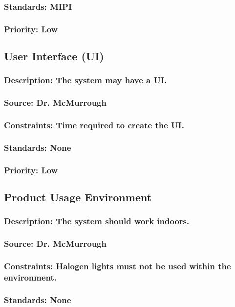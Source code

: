 \subsubsection{Standards: MIPI}
\subsubsection{Priority: Low}

\subsection{User Interface (UI)}
\subsubsection{Description: The system may have a UI.}
\subsubsection{Source: Dr. McMurrough}
\subsubsection{Constraints: Time required to create the UI.}
\subsubsection{Standards: None}
\subsubsection{Priority: Low}

\subsection{Product Usage Environment}
\subsubsection{Description: The system should work indoors.}
\subsubsection{Source: Dr. McMurrough}
\subsubsection{Constraints: Halogen lights must not be used within the environment.}
\subsubsection{Standards: None}

